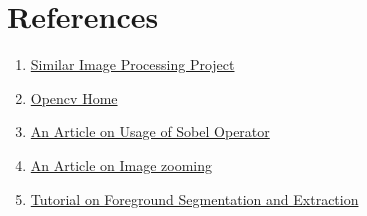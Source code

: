 \documentclass[12pt,a4paper]{article}
\begin{document}
\section*{References}
\begin{enumerate}
    \item \href{https://github.com/bimalka98/Computer-Vision-and-Image-Processing}{Similar Image Processing Project}
    \item \href{https://opencv.org/}{Opencv Home}
    \item \href{https://www.tutorialspoint.com/dip/sobel_operator.htm}{An Article on Usage of Sobel Operator}
    \item \href{https://medium.com/mlearning-ai/image-zoom-using-computer-vision-using-opencv-and-python-1eeaee53eeb8}{An Article on Image zooming}
    \item \href{https://pyimagesearch.com/2020/07/27/opencv-grabcut-foreground-segmentation-and-extraction/}{Tutorial on Foreground Segmentation and Extraction}
\end{enumerate}
\end{document}
